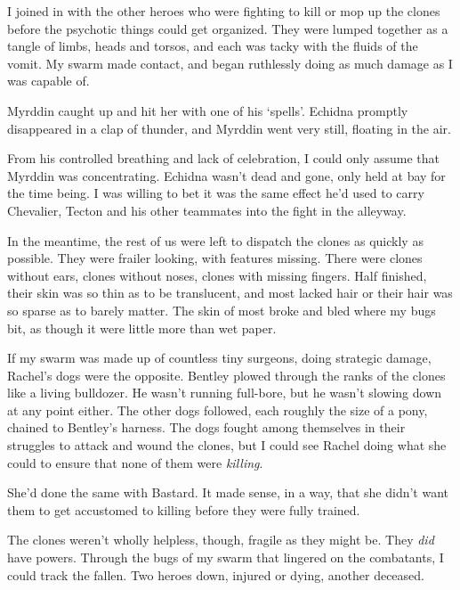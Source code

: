 I joined in with the other heroes who were fighting to kill or mop up the clones before the psychotic things could get organized.  They were lumped together as a tangle of limbs, heads and torsos, and each was tacky with the fluids of the vomit.  My swarm made contact, and began ruthlessly doing as much damage as I was capable of.



Myrddin caught up and hit her with one of his `spells'.  Echidna promptly disappeared in a clap of thunder, and Myrddin went very still, floating in the air.



From his controlled breathing and lack of celebration, I could only assume that Myrddin was concentrating.  Echidna wasn't dead and gone, only held at bay for the time being.  I was willing to bet it was the same effect he'd used to carry Chevalier, Tecton and his other teammates into the fight in the alleyway.



In the meantime, the rest of us were left to dispatch the clones as quickly as possible.  They were frailer looking, with features missing.  There were clones without ears, clones without noses, clones with missing fingers.  Half finished, their skin was so thin as to be translucent, and most lacked hair or their hair was so sparse as to barely matter.  The skin of most broke and bled where my bugs bit, as though it were little more than wet paper.



If my swarm was made up of countless tiny surgeons, doing strategic damage, Rachel's dogs were the opposite.  Bentley plowed through the ranks of the clones like a living bulldozer.  He wasn't running full-bore, but he wasn't slowing down at any point either.  The other dogs followed, each roughly the size of a pony, chained to Bentley's harness.  The dogs fought among themselves in their struggles to attack and wound the clones, but I could see Rachel doing what she could to ensure that none of them were \emph{killing}.



She'd done the same with Bastard.  It made sense, in a way, that she didn't want them to get accustomed to killing before they were fully trained.



The clones weren't wholly helpless, though, fragile as they might be.  They \emph{did} have powers.  Through the bugs of my swarm that lingered on the combatants, I could track the fallen.  Two heroes down, injured or dying, another deceased.



